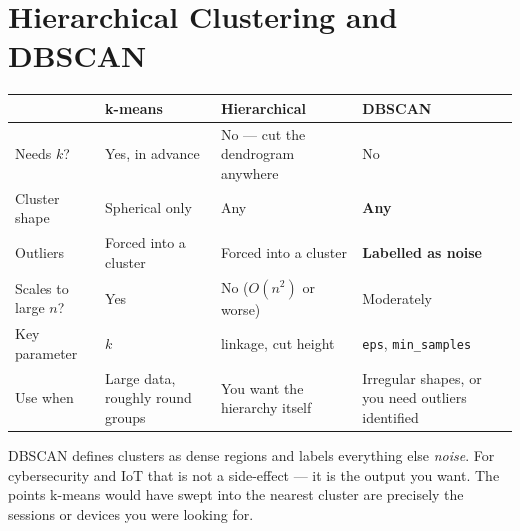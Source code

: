 \section{Hierarchical Clustering and DBSCAN}

\begin{longtable}{@{}L{2.5cm}L{3.5cm}L{3.6cm}L{4.4cm}@{}}
\toprule
{}
& \textbf{k-means} & \textbf{Hierarchical} & \textbf{DBSCAN} \\
\midrule
\endhead
Needs $k$? & Yes, in advance & No --- cut the dendrogram anywhere & No \\
Cluster shape & Spherical only & Any & \textbf{Any} \\
Outliers & Forced into a cluster & Forced into a cluster & \textbf{Labelled as noise} \\
Scales to large $n$? & Yes & No ($O(n^2)$ or worse) & Moderately \\
Key parameter & $k$ & linkage, cut height & \texttt{eps}, \texttt{min\_samples} \\
Use when & Large data, roughly round groups & You want the hierarchy itself & Irregular shapes, or you need outliers identified \\
\bottomrule
\end{longtable}

\begin{conceptbox}
DBSCAN defines clusters as dense regions and labels everything else \emph{noise}.
For cybersecurity and IoT that is not a side-effect --- it is the output you want.
The points k-means would have swept into the nearest cluster are precisely the
sessions or devices you were looking for.
\end{conceptbox}

